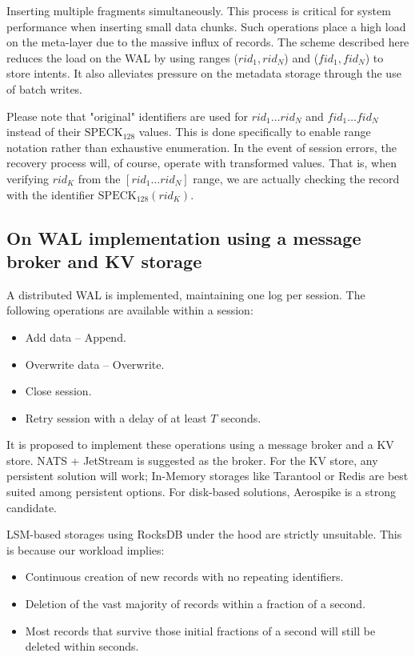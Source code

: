 \documentclass[a4paper,12pt]{article}
\begin{document}
    Inserting multiple fragments simultaneously. This process is critical for system performance when inserting small data chunks. Such operations place a high load on the meta-layer due to the massive influx of records. The scheme described here reduces the load on the WAL by using ranges ($rid_1, rid_N$) and ($fid_1, fid_N$) to store intents. It also alleviates pressure on the metadata storage through the use of batch writes.

    Please note that "original" identifiers are used for $rid_1 \dots rid_N$ and $fid_1 \dots fid_N$ instead of their $\mathrm{SPECK}_{128}$ values. This is done specifically to enable range notation rather than exhaustive enumeration. In the event of session errors, the recovery process will, of course, operate with transformed values. That is, when verifying $rid_K$ from the $[rid_1 \dots rid_N]$ range, we are actually checking the record with the identifier $\mathrm{SPECK}_{128}(rid_K)$.

    \subsection{On WAL implementation using a message broker and KV storage}

    A distributed WAL is implemented, maintaining one log per session. The following operations are available within a session:

    \begin{itemize}
        \item Add data – Append.
        \item Overwrite data – Overwrite.
        \item Close session.
        \item Retry session with a delay of at least $T$ seconds.
    \end{itemize}

    It is proposed to implement these operations using a message broker and a KV store. NATS + JetStream is suggested as the broker. For the KV store, any persistent solution will work; In-Memory storages like Tarantool or Redis are best suited among persistent options. For disk-based solutions, Aerospike is a strong candidate.

    LSM-based storages using RocksDB under the hood are strictly unsuitable. This is because our workload implies:

    \begin{itemize}
        \item Continuous creation of new records with no repeating identifiers.
        \item Deletion of the vast majority of records within a fraction of a second.
        \item Most records that survive those initial fractions of a second will still be deleted within seconds.
    \end{itemize}
\end{document}
